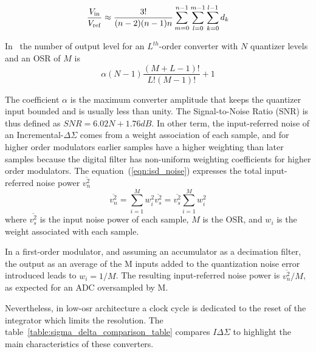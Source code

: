 \begin{equation}
	\frac{V_{\rm in}}{V_{\rm ref}}\approx \frac{3!}{(n-2)(n-1)n}\sum_{m=0}^{n-1}\sum_{l=0}^{m-1}\sum_{k=0}^{l-1}d_{k}
\label{eqn:isd-decimation}
\end{equation}

In~\cite{Caldwell2010} the number of output level for an \(L^{th}\)-order converter with \(N\) quantizer levels and an OSR of \(M\) is 
\begin{equation}
	\alpha(N-1)\frac{(M+L-1)!}{L!(M-1)!}+1
\label{eqn:isd-levels}
\end{equation}

The coefficient \(\alpha \) is the maximum converter amplitude that keeps the quantizer input bounded and is usually less than unity. The Signal-to-Noise Ratio (SNR) is thus defined as \(SNR = 6.02N + 1.76dB\). In other term, the input-referred noise of an Incremental-\(\Delta\Sigma \) comes from a weight association of each sample, and for higher order modulators earlier samples have a higher weighting than later samples because the digital filter has non-uniform weighting coefficients for higher order modulators. The equation~(\ref{eqn:isd_noise}) expresses the total input-referred noise power \(\overline{v_{n}^{2}}\)
\begin{equation}
	\overline{v_{n}^{2}}=\sum_{i=1}^{M}w_{i}^{2}\overline{v_{s}^{2}}=\overline{v_{s}^{2}}\sum_{i=1}^{M}w_{i}^{2}
\label{eqn:isd_noise}
\end{equation}
where \(\overline{v_{s}^{2}}\) is the input noise power of each sample, \(M\) is the OSR, and \(w_i\) is the weight associated with each sample.

In a first-order modulator, and assuming an accumulator as a decimation filter, the output as an average of the M inputs added to the quantization noise error introduced leads to \(w_i=1/M\). The resulting input-referred noise power is \(\overline{v_{n}^{2}}/M\), as expected for an ADC oversampled by M.

Nevertheless, in low-osr architecture a clock cycle is dedicated to the reset of the integrator which limits the resolution. The table~\ref{table:sigma_delta_comparison_table} compares \(I\Delta\Sigma \) to highlight the main characteristics of these converters. 

